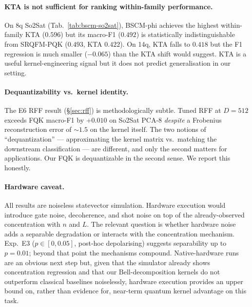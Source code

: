 \documentclass[pdflatex,sn-mathphys]{sn-jnl}
\theoremstyle{plain}
\theoremstyle{remark}
\theoremstyle{definition}
\begin{document}
\paragraph{KTA is not sufficient for ranking within-family performance.}
On 8q So2Sat (Tab.~\ref{tab:bscm-so2sat}), BSCM-phi achieves the highest within-family KTA ($0.596$) but its macro-F1 ($0.492$) is statistically indistinguishable from SRQFM-PQK ($0.493$, KTA $0.422$). On 14q, KTA falls to $0.418$ but the F1 regression is much smaller ($-0.065$) than the KTA shift would suggest. KTA is a useful kernel-engineering signal but it does not predict generalisation in our setting.

\paragraph{Dequantizability vs.\ kernel identity.}
The E6 RFF result (\S\ref{sec:rff}) is methodologically subtle. Tuned RFF at $D=512$ exceeds FQK macro-F1 by $+0.010$ on So2Sat PCA-8 \emph{despite} a Frobenius reconstruction error of $\sim\!1.5$ on the kernel itself. The two notions of ``dequantization'' --- approximating the kernel matrix vs.\ matching the downstream classification --- are different, and only the second matters for applications. Our FQK is dequantizable in the second sense. We report this honestly.

\paragraph{Hardware caveat.}\label{sec:limits}
All results are noiseless statevector simulation. Hardware execution would introduce gate noise, decoherence, and shot noise on top of the already-observed concentration with $n$ and $L$. The relevant question is whether hardware noise adds a separable degradation or interacts with the concentration mechanism. Exp.\ E3 ($p\in [0,0.05]$, post-hoc depolarising) suggests separability up to $p=0.01$; beyond that point the mechanisms compound. Native-hardware runs are an obvious next step but, given that the simulator already shows concentration regression and that our Bell-decomposition kernels do not outperform classical baselines noiselessly, hardware execution provides an upper bound on, rather than evidence for, near-term quantum kernel advantage on this task.
\end{document}
